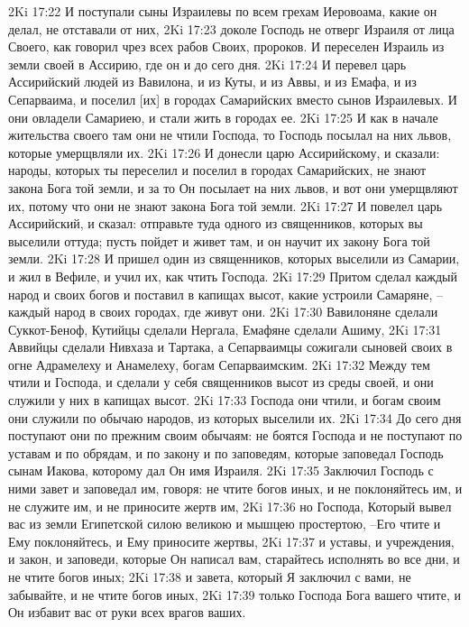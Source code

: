 2Ki 17:22  И поступали сыны Израилевы по всем грехам Иеровоама, какие он делал, не отставали от них,
2Ki 17:23  доколе Господь не отверг Израиля от лица Своего, как говорил чрез всех рабов Своих, пророков. И переселен Израиль из земли своей в Ассирию, где он и до сего дня.
2Ki 17:24  И перевел царь Ассирийский людей из Вавилона, и из Куты, и из Аввы, и из Емафа, и из Сепарваима, и поселил [их] в городах Самарийских вместо сынов Израилевых. И они овладели Самариею, и стали жить в городах ее.
2Ki 17:25  И как в начале жительства своего там они не чтили Господа, то Господь посылал на них львов, которые умерщвляли их.
2Ki 17:26  И донесли царю Ассирийскому, и сказали: народы, которых ты переселил и поселил в городах Самарийских, не знают закона Бога той земли, и за то Он посылает на них львов, и вот они умерщвляют их, потому что они не знают закона Бога той земли.
2Ki 17:27  И повелел царь Ассирийский, и сказал: отправьте туда одного из священников, которых вы выселили оттуда; пусть пойдет и живет там, и он научит их закону Бога той земли.
2Ki 17:28  И пришел один из священников, которых выселили из Самарии, и жил в Вефиле, и учил их, как чтить Господа.
2Ki 17:29  Притом сделал каждый народ и своих богов и поставил в капищах высот, какие устроили Самаряне, --каждый народ в своих городах, где живут они.
2Ki 17:30  Вавилоняне сделали Суккот-Беноф, Кутийцы сделали Нергала, Емафяне сделали Ашиму,
2Ki 17:31  Аввийцы сделали Нивхаза и Тартака, а Сепарваимцы сожигали сыновей своих в огне Адрамелеху и Анамелеху, богам Сепарваимским.
2Ki 17:32  Между тем чтили и Господа, и сделали у себя священников высот из среды своей, и они служили у них в капищах высот.
2Ki 17:33  Господа они чтили, и богам своим они служили по обычаю народов, из которых выселили их.
2Ki 17:34  До сего дня поступают они по прежним своим обычаям: не боятся Господа и не поступают по уставам и по обрядам, и по закону и по заповедям, которые заповедал Господь сынам Иакова, которому дал Он имя Израиля.
2Ki 17:35  Заключил Господь с ними завет и заповедал им, говоря: не чтите богов иных, и не поклоняйтесь им, и не служите им, и не приносите жертв им,
2Ki 17:36  но Господа, Который вывел вас из земли Египетской силою великою и мышцею простертою, --Его чтите и Ему поклоняйтесь, и Ему приносите жертвы,
2Ki 17:37  и уставы, и учреждения, и закон, и заповеди, которые Он написал вам, старайтесь исполнять во все дни, и не чтите богов иных;
2Ki 17:38  и завета, который Я заключил с вами, не забывайте, и не чтите богов иных,
2Ki 17:39  только Господа Бога вашего чтите, и Он избавит вас от руки всех врагов ваших.
